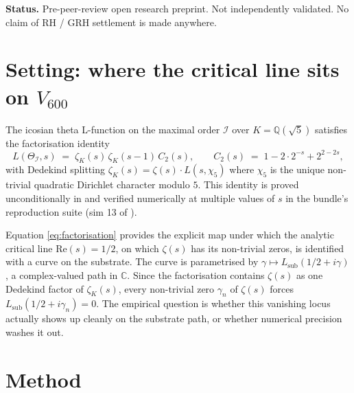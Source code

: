 \documentclass[11pt,a4paper]{article}
\newcommand{\II}{\mathcal{I}}
\newcommand{\Q}{\mathbb{Q}}
\newcommand{\C}{\mathbb{C}}
\newcommand{\Lsub}{L_{\mathrm{sub}}}
\begin{document}
\begin{abstract}
We make no claim of settling the Riemann Hypothesis. We claim only
that the substrate image of $\zeta$'s critical line is exhibited
explicitly, the prime representation counts are confirmed at the
formula's quoted precision, and the open follow-on (identification
of the $\tau$-involution carrying the $94 + 13 + 13$ split) is
pinned down to a precise mathematical statement.
\end{abstract}

\bigskip

\noindent\textbf{Status.} Pre-peer-review open research preprint.
Not independently validated. No claim of RH / GRH settlement is
made anywhere.

\tableofcontents

\newpage

\section{Setting: where the critical line sits on $V_{600}$}
\label{sec:setting}

The icosian theta L-function on the maximal order $\II$ over
$K = \Q(\sqrt 5)$ satisfies the factorisation identity
\begin{equation}
\label{eq:factorisation}
  L(\Theta_\II, s) \;=\; \zeta_K(s)\,\zeta_K(s-1)\,C_2(s),
  \qquad
  C_2(s) \;=\; 1 - 2 \cdot 2^{-s} + 2^{2-2s},
\end{equation}
with Dedekind splitting
$\zeta_K(s) = \zeta(s) \cdot L(s, \chi_5)$ where $\chi_5$ is the
unique non-trivial quadratic Dirichlet character modulo $5$. This
identity is proved unconditionally in \cite{icosianTriad} and
verified numerically at multiple values of $s$ in the bundle's
reproduction suite (sim 13 of \cite{icosianTriad}).

Equation \eqref{eq:factorisation} provides the explicit map under
which the analytic critical line $\mathrm{Re}(s) = 1/2$, on which
$\zeta(s)$ has its non-trivial zeros, is identified with a curve
on the substrate. The curve is parametrised by
$\gamma \mapsto \Lsub(1/2 + i\gamma)$, a complex-valued path in
$\C$. Since the factorisation contains $\zeta(s)$ as one Dedekind
factor of $\zeta_K(s)$, every non-trivial zero $\gamma_n$ of
$\zeta(s)$ forces $\Lsub(1/2 + i\gamma_n) = 0$. The empirical
question is whether this vanishing locus actually shows up cleanly
on the substrate path, or whether numerical precision washes it
out.

\section{Method}
\label{sec:method}
\end{document}
